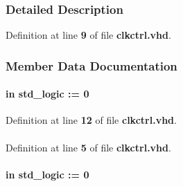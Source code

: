 \subsubsection{Detailed Description}


Definition at line {\bf 9} of file {\bf clkctrl.\+vhd}.



\subsubsection{Member Data Documentation}
\paragraph[{ena}]{ {\bfseries \textcolor{keywordflow}{in}\textcolor{vhdlchar}{ }} {\bfseries \textcolor{comment}{std\+\_\+logic}\textcolor{vhdlchar}{ }\textcolor{vhdlchar}{ }\textcolor{vhdlchar}{\+:}\textcolor{vhdlchar}{=}\textcolor{vhdlchar}{ }\textcolor{vhdlchar}{ }\textcolor{vhdlchar}{\textquotesingle{}}\textcolor{vhdlchar}{ } \textcolor{vhdldigit}{0} \textcolor{vhdlchar}{ }\textcolor{vhdlchar}{\textquotesingle{}}\textcolor{vhdlchar}{ }} \hspace{0.3cm}{\ttfamily [Port]}}\label{classclkctrl_ad5e8281c9cd412b456f0d38b7c0e6c09}


Definition at line {\bf 12} of file {\bf clkctrl.\+vhd}.

\paragraph[{I\+E\+EE}]{\hspace{0.3cm}{\ttfamily [Library]}}\label{classclkctrl_ae4f03c286607f3181e16b9aa12d0c6d4}


Definition at line {\bf 5} of file {\bf clkctrl.\+vhd}.

\paragraph[{inclk}]{ {\bfseries \textcolor{keywordflow}{in}\textcolor{vhdlchar}{ }} {\bfseries \textcolor{comment}{std\+\_\+logic}\textcolor{vhdlchar}{ }\textcolor{vhdlchar}{ }\textcolor{vhdlchar}{\+:}\textcolor{vhdlchar}{=}\textcolor{vhdlchar}{ }\textcolor{vhdlchar}{ }\textcolor{vhdlchar}{\textquotesingle{}}\textcolor{vhdlchar}{ } \textcolor{vhdldigit}{0} \textcolor{vhdlchar}{ }\textcolor{vhdlchar}{\textquotesingle{}}\textcolor{vhdlchar}{ }} \hspace{0.3cm}{\ttfamily [Port]}}\label{classclkctrl_af0e0748a266f306a8817e6c13335d998}


